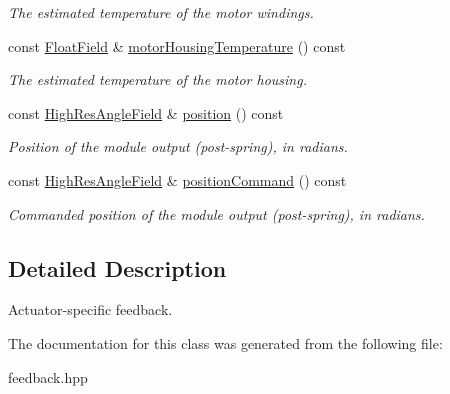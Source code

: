 \begin{DoxyCompactItemize}
\begin{DoxyCompactList}\small\item\em The estimated temperature of the motor windings. \end{DoxyCompactList}\item 
const \hyperlink{classhebi_1_1Feedback_1_1FloatField}{Float\+Field} \& \hyperlink{classhebi_1_1Feedback_1_1Actuator_adbef94f87e10202b4e99929ac22a2366}{motor\+Housing\+Temperature} () const \hypertarget{classhebi_1_1Feedback_1_1Actuator_adbef94f87e10202b4e99929ac22a2366}{}\label{classhebi_1_1Feedback_1_1Actuator_adbef94f87e10202b4e99929ac22a2366}

\begin{DoxyCompactList}\small\item\em The estimated temperature of the motor housing. \end{DoxyCompactList}\item 
const \hyperlink{classhebi_1_1Feedback_1_1HighResAngleField}{High\+Res\+Angle\+Field} \& \hyperlink{classhebi_1_1Feedback_1_1Actuator_a8d07d54b9140ccb45803e4cf81f117b4}{position} () const \hypertarget{classhebi_1_1Feedback_1_1Actuator_a8d07d54b9140ccb45803e4cf81f117b4}{}\label{classhebi_1_1Feedback_1_1Actuator_a8d07d54b9140ccb45803e4cf81f117b4}

\begin{DoxyCompactList}\small\item\em Position of the module output (post-\/spring), in radians. \end{DoxyCompactList}\item 
const \hyperlink{classhebi_1_1Feedback_1_1HighResAngleField}{High\+Res\+Angle\+Field} \& \hyperlink{classhebi_1_1Feedback_1_1Actuator_af9d62c004ea0636d81505f059fce9a64}{position\+Command} () const \hypertarget{classhebi_1_1Feedback_1_1Actuator_af9d62c004ea0636d81505f059fce9a64}{}\label{classhebi_1_1Feedback_1_1Actuator_af9d62c004ea0636d81505f059fce9a64}

\begin{DoxyCompactList}\small\item\em Commanded position of the module output (post-\/spring), in radians. \end{DoxyCompactList}\end{DoxyCompactItemize}


\subsection{Detailed Description}
Actuator-\/specific feedback. 

The documentation for this class was generated from the following file\+:\begin{DoxyCompactItemize}
\item 
feedback.\+hpp\end{DoxyCompactItemize}
